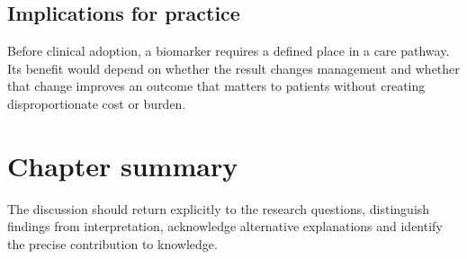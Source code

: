 \subsection{Implications for practice}
Before clinical adoption, a biomarker requires a defined place in a care
pathway. Its benefit would depend on whether the result changes management and
whether that change improves an outcome that matters to patients without
creating disproportionate cost or burden.

\section{Chapter summary}
The discussion should return explicitly to the research questions, distinguish
findings from interpretation, acknowledge alternative explanations and identify
the precise contribution to knowledge.
